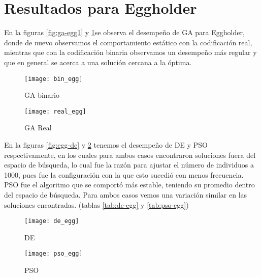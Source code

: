 \documentclass[letterpaper,12pt]{article}
\theoremstyle{definition}
\begin{document}
\section{Resultados para Eggholder}

En la figuras \ref{fig:ga-egg1} y \ref{fig:ga-egg2}se observa el desempeño de GA para Eggholder, donde de nuevo observamos el comportamiento estático con la codificación real, mientras que con la codificación binaria observamos un desempeño más regular y que en general se acerca a una solución cercana a la óptima.

\medskip

\begin{figure}[!h]
    \texttt{[image: bin\_egg]}
    \caption{GA binario}
    \label{fig:ga-egg1}
  \endminipage\hfill
    \texttt{[image: real\_egg]}
    \caption{GA Real}
    \label{fig:ga-egg2}
  \endminipage\hfill
\end{figure}

En la figuras \ref{fig:egg-de} y \ref{fig:egg-pso} tenemos el desempeño de DE y PSO respectivamente, en los cuales para ambos casos encontraron soluciones fuera del espacio de búsqueda, lo cual fue la razón para ajustar el número de individuos a 1000, pues fue la configuración con la que esto sucedió con menos frecuencia. PSO fue el algoritmo que se comportó más estable, teniendo su promedio dentro del espacio de búsqueda. Para ambos casos vemos una variación similar en las soluciones encontradas. (tablas \ref{tab:de-egg} y \ref{tab:pso-egg})

\begin{figure}[!h]
    \texttt{[image: de\_egg]}
    \caption{DE}
    \label{fig:egg-de}
  \endminipage\hfill
    \texttt{[image: pso\_egg]}
    \caption{PSO}
    \label{fig:egg-pso}
  \endminipage\hfill
  
\end{figure}
\end{document}
